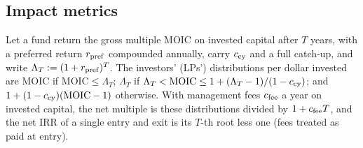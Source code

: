 \subsection{Impact metrics}\label{sec:regimes-metrics}

\begin{lemma}\label{lem:reg-waterfall}
Let a fund return the gross multiple $\mathrm{MOIC}$ on invested capital after $T$ years, with a preferred return $r_{\rm pref}$ compounded annually, carry $c_{\rm cy}$ and a full catch-up, and write $\Lambda_T:=(1+r_{\rm pref})^T$. The investors' (LPs') distributions per dollar invested are $\mathrm{MOIC}$ if $\mathrm{MOIC}\le\Lambda_T$; $\Lambda_T$ if $\Lambda_T<\mathrm{MOIC}\le1+(\Lambda_T-1)/(1-c_{\rm cy})$; and $1+(1-c_{\rm cy})(\mathrm{MOIC}-1)$ otherwise. With management fees $c_{\rm fee}$ a year on invested capital, the net multiple is these distributions divided by $1+c_{\rm fee}T$, and the net IRR of a single entry and exit is its $T$-th root less one (fees treated as paid at entry).
\end{lemma}

